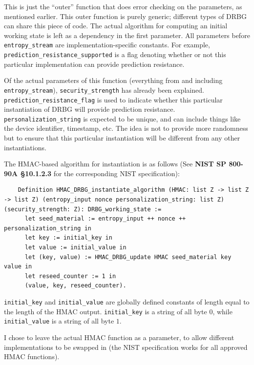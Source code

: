 \documentclass[pageno]{jpaper}
\newcommand{\stdtitle}[1]{\textbf{#1}}
\begin{document}
This is just the “outer” function that does error checking on the parameters, as mentioned earlier. This outer function is purely generic; different types of DRBG can share this piece of code. The actual algorithm for computing an initial working state is left as a dependency in the first parameter. All parameters before \lstinline{entropy_stream} are implementation-specific constants. For example, \lstinline{prediction_resistance_supported} is a flag denoting whether or not this particular implementation can provide prediction resistance.

Of the actual parameters of this function (everything from and including \lstinline{entropy_stream}), \lstinline{security_strength} has already been explained. \lstinline{prediction_resistance_flag} is used to indicate whether this particular instantiation of DRBG will provide prediction resistance.\\ \lstinline{personalization_string} is expected to be unique, and can include things like the device identifier, timestamp, etc. The idea is not to provide more randomness but to ensure that this particular instantiation will be different from any other instantiations.

The HMAC-based algorithm for instantiation is as follows (See \stdtitle{NIST SP 800-90A \S 10.1.2.3} for the corresponding NIST specification):

\begin{lstlisting}
    Definition HMAC_DRBG_instantiate_algorithm (HMAC: list Z -> list Z -> list Z) (entropy_input nonce personalization_string: list Z) (security_strength: Z): DRBG_working_state :=
      let seed_material := entropy_input ++ nonce ++ personalization_string in
      let key := initial_key in
      let value := initial_value in
      let (key, value) := HMAC_DRBG_update HMAC seed_material key value in
      let reseed_counter := 1 in
      (value, key, reseed_counter).
\end{lstlisting}


\lstinline{initial_key} and \lstinline{initial_value} are globally defined constants of length equal to the length of the HMAC output. \lstinline{initial_key} is a string of all byte $0$, while \lstinline{initial_value} is a string of all byte $1$.

I chose to leave the actual HMAC function as a parameter, to allow different implementations to be swapped in (the NIST specification works for all approved HMAC functions).
\end{document}
